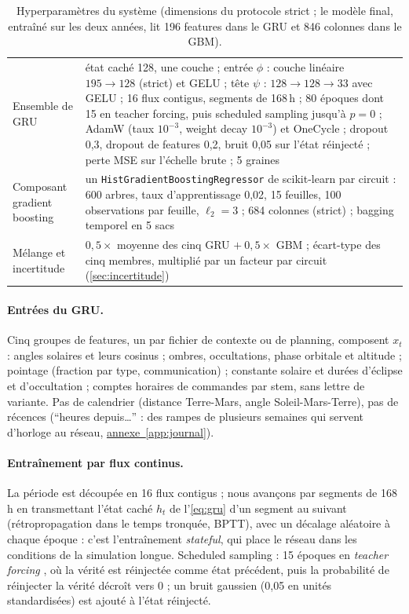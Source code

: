 \documentclass[11pt,a4paper]{article}
\newcommand{\annexeref}[1]{\hyperref[#1]{annexe~\ref*{#1}}}
\begin{document}
\begin{table}[htbp]
\centering\small
\caption{Hyperparamètres du système (dimensions du protocole strict ; le modèle final, entraîné sur les deux années, lit 196 features dans le GRU et 846 colonnes dans le GBM).}
\label{tab:hyper}
\begin{tabularx}{\textwidth}{L{3.4cm} Y}
\toprule
Ensemble de GRU & état caché 128, une couche ; entrée $\phi$ : couche linéaire $195 \to 128$ (strict) et GELU ; tête $\psi$ : $128 \to 128 \to 33$ avec GELU ; 16 flux contigus, segments de 168\,h ; 80 époques dont 15 en teacher forcing, puis scheduled sampling jusqu'à $p = 0$ ; AdamW \citep{loshchilov2019decoupled} (taux $10^{-3}$, weight decay $10^{-3}$) et OneCycle \citep{smith2017super} ; dropout 0,3, dropout de features 0,2, bruit 0,05 sur l'état réinjecté ; perte MSE sur l'échelle brute ; 5 graines \\
Composant gradient boosting & un \texttt{HistGradientBoostingRegressor} de scikit-learn par circuit : 600 arbres, taux d'apprentissage 0,02, 15 feuilles, 100 observations par feuille, $\ell_2 = 3$ ; 684 colonnes (strict) ; bagging temporel en 5 sacs \\
Mélange et incertitude & $0{,}5 \times$ moyenne des cinq GRU $+\ 0{,}5 \times$ GBM ; écart-type des cinq membres, multiplié par un facteur par circuit (\autoref{sec:incertitude}) \\
\bottomrule
\end{tabularx}
\end{table}

\paragraph{Entrées du GRU.} Cinq groupes de features, un par fichier de contexte ou de planning, composent $x_t$ : angles solaires et leurs cosinus ; ombres, occultations, phase orbitale et altitude ; pointage (fraction par type, communication) ; constante solaire et durées d'éclipse et d'occultation ; comptes horaires de commandes par stem, sans lettre de variante. Pas de calendrier (distance Terre-Mars, angle Soleil-Mars-Terre), pas de récences (\enquote{heures depuis\ldots} : des rampes de plusieurs semaines qui servent d'horloge au réseau, \annexeref{app:journal}).

\paragraph{Entraînement par flux continus.} La période est découpée en 16 flux contigus ; nous avançons par segments de 168\,h en transmettant l'état caché $h_t$ de l'\autoref{eq:gru} d'un segment au suivant (rétropropagation dans le temps tronquée, BPTT), avec un décalage aléatoire à chaque époque : c'est l'entraînement \emph{stateful}, qui place le réseau dans les conditions de la simulation longue. Scheduled sampling \citep{bengio2015scheduled} : 15 époques en \emph{teacher forcing} \citep{williams1989learning}, où la vérité est réinjectée comme état précédent, puis la probabilité de réinjecter la vérité décroît vers 0 ; un bruit gaussien (0,05 en unités standardisées) est ajouté à l'état réinjecté.
\end{document}

